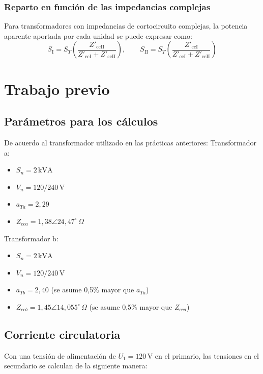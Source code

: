 \documentclass[12pt]{article}
\begin{document}
\subsubsection{Reparto en funci\'on de las impedancias complejas}
Para transformadores con impedancias de cortocircuito complejas, la potencia aparente aportada por cada unidad se puede expresar como:
\begin{equation}
    S_{\mathrm{I}}=S_T\left(\frac{Z'_{\mathrm{ccII}}}{Z'_{\mathrm{ccI}}+Z'_{\mathrm{ccII}}}\right),
    \qquad
    S_{\mathrm{II}}=S_T\left(\frac{Z'_{\mathrm{ccI}}}{Z'_{\mathrm{ccI}}+Z'_{\mathrm{ccII}}}\right)
\end{equation}
\newpage

\section{Trabajo previo}

\subsection{Par\'ametros para los c\'alculos}

De acuerdo al transformador utilizado en las pr\'acticas anteriores:
Transformador a:
\begin{itemize}
    \item $S_n = 2\,\text{kVA}$
    \item $V_n = 120/240\,\text{V}$
    \item $a_{Ta} = 2{,}29$
    \item $Z_{cca} = 1{,}38\angle 24{,}47^\circ\,\Omega$
\end{itemize}

Transformador b:
\begin{itemize}
    \item $S_n = 2\,\text{kVA}$
    \item $V_n = 120/240\,\text{V}$
    \item $a_{Tb} = 2{,}40$ (se asume 0{,}5$\%$ mayor que $a_{Ta}$)
    \item $Z_{ccb} = 1{,}45\angle 14{,}055^\circ\,\Omega$ (se asume 0{,}5$\%$ mayor que $Z_{cca}$)
\end{itemize}

\subsection{Corriente circulatoria}

Con una tensi\'on de alimentaci\'on de $U_1 = 120\,\text{V}$ en el primario, las tensiones en el secundario se calculan de la siguiente manera:
\end{document}
